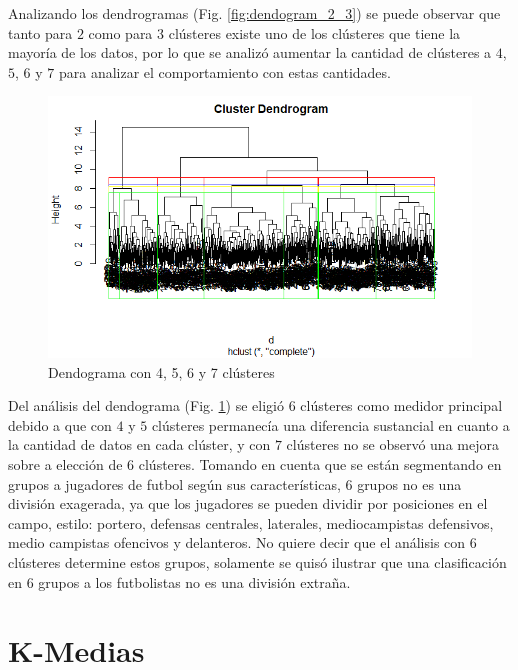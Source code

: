 \documentclass[a4paper,10pt,twocolumn]{article}
\begin{document}
Analizando los dendrogramas (Fig. \ref{fig:dendogram_2_3}) se puede observar que tanto para $2$ como para $3$ clústeres existe uno de los clústeres que tiene la mayoría de los datos, por lo que se analizó aumentar la cantidad de clústeres a $4$, $5$, $6$ y $7$ para analizar el comportamiento con estas cantidades.

\begin{figure}[htb]%
	\begin{center}
		\includegraphics[width=\linewidth]{dendogram_4_7}
	\end{center}
	\caption{Dendograma con 4, 5, 6 y 7 clústeres \label{fig:dendogram_4_7}}%
\end{figure}

Del análisis del dendograma (Fig. \ref{fig:dendogram_4_7}) se eligió $6$ clústeres como medidor principal debido a que con $4$ y $5$ clústeres permanecía una diferencia sustancial en cuanto a la cantidad de datos en cada clúster, y con $7$ clústeres no se observó una mejora sobre a elección de $6$ clústeres. Tomando en cuenta que se están segmentando en grupos a jugadores de futbol según sus características, $6$ grupos no es una división exagerada, ya que los jugadores se pueden dividir por posiciones en el campo, estilo: portero, defensas centrales, laterales, mediocampistas defensivos, medio campistas ofencivos y delanteros. No quiere decir que el análisis con $6$ clústeres determine estos grupos, solamente se quisó ilustrar que una clasificación en $6$ grupos a los futbolistas no es una división extraña.

\section{K-Medias}\label{sec:kmeans}
\end{document}
